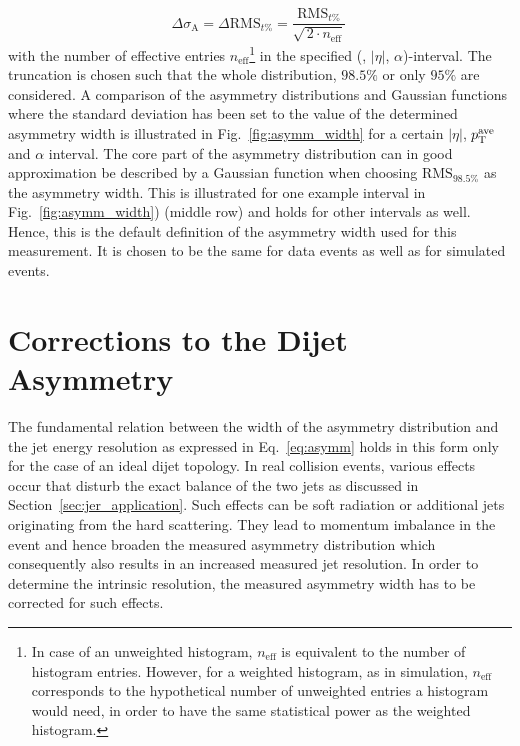 \begin{equation}
\Delta \sigma_\mathrm{A} = \Delta \mathrm{RMS}_{t\%} = \frac{\mathrm{RMS}_{t\%}}{\sqrt{\, 2 \cdot n_\mathrm{eff}}} \,
\end{equation} 
with the number of effective entries $n_\mathrm{eff}$\footnote{In case of an unweighted histogram, $n_\mathrm{eff}$ is equivalent to the number of histogram entries. However, for a weighted histogram, as \eg in simulation, $n_\mathrm{eff}$ corresponds to the hypothetical number of unweighted entries a histogram would need, in order to have the same statistical power as the weighted histogram.} in the specified (\ptave, $|\eta|$, $\alpha$)-interval. The truncation is chosen such that the whole distribution, $98.5\%$ or only $95\%$ are considered. A comparison of the asymmetry distributions and Gaussian functions where the standard deviation has been set to the value of the determined asymmetry width is illustrated in Fig.~\ref{fig:asymm_width} for a certain $|\eta|$, $p_{\text{T}}^\mathrm{ave}$ and $\alpha$ interval. The core part of the asymmetry distribution can in good approximation be described by a Gaussian function when choosing $\mathrm{RMS}_{98.5\%}$ as the asymmetry width. This is illustrated for one example interval in Fig.~\ref{fig:asymm_width}) (middle row) and holds for other intervals as well. Hence, this is the default definition of the asymmetry width used for this measurement. It is chosen to be the same for data events as well as for simulated events.  

\section{Corrections to the Dijet Asymmetry}
\label{sec:jer_corrections}
The fundamental relation between the width of the asymmetry distribution and the jet energy resolution as expressed in Eq.~\ref{eq:asymm} holds in this form only for the case of an ideal dijet topology. In real collision events, various effects occur that disturb the exact balance of the two jets as discussed in Section~\ref{sec:jer_application}. Such effects can be soft radiation or additional jets originating from the hard scattering. They lead to momentum imbalance in the event and hence broaden the measured asymmetry distribution which consequently also results in an increased measured jet resolution. In order to determine the intrinsic resolution, the measured asymmetry width has to be corrected for such effects.

